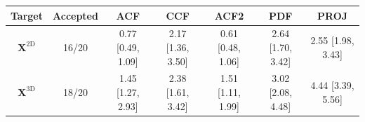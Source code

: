 \begin{tabular}{ccccccc}
\hline
Target & Accepted & ACF & CCF & ACF2 & PDF & PROJ \\
\hline
$\boldsymbol{X}^{\mathrm{2D}}$ & 16/20 & 0.77 [0.49, 1.09] & 2.17 [1.36, 3.50] & 0.61 [0.48, 1.06] & 2.64 [1.70, 3.42] & 2.55 [1.98, 3.43] \\
$\boldsymbol{X}^{\mathrm{3D}}$ & 18/20 & 1.45 [1.27, 2.93] & 2.38 [1.61, 3.42] & 1.51 [1.11, 1.99] & 3.02 [2.08, 4.48] & 4.44 [3.39, 5.56] \\
\hline
\end{tabular}

